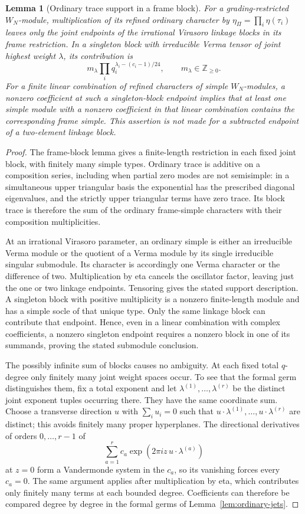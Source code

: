 \documentclass[11pt,a4paper]{article}
\numberwithin{equation}{section}
\newtheorem{lemma}[theorem]{Lemma}
\theoremstyle{definition}\newtheorem{definition}[theorem]{Definition}
\theoremstyle{remark}\newtheorem{remark}[theorem]{Remark}
\begin{document}
\begin{lemma}[Ordinary trace support in a frame block]
\label{lem:ordinary-support}
For a grading-restricted $W_N$-module, multiplication of its refined
ordinary character by $\eta_\Pi=\prod_i\eta(\tau_i)$ leaves only
the joint endpoints of the irrational Virasoro linkage blocks in
its frame restriction.  In a singleton block with irreducible
Verma tensor of joint highest weight $\lambda$, its contribution is
\[
 m_\lambda\prod_iq_i^{\lambda_i-(c_i-1)/24},
 \qquad m_\lambda\in\mathbb Z_{\ge0}.
\]
For a finite linear combination of refined characters of simple
$W_N$-modules, a nonzero coefficient at such a \emph{singleton-block}
endpoint implies that at least one simple module with a nonzero
coefficient in that linear combination contains the corresponding
frame simple.  This assertion is not made for a subtracted endpoint
of a two-element linkage block.
\end{lemma}
\begin{proof}
The frame-block lemma gives a finite-length restriction in each
fixed joint block, with finitely many simple types.  Ordinary trace
is additive on a composition series, including when partial zero
modes are not semisimple: in a simultaneous upper triangular basis
the exponential has the prescribed diagonal eigenvalues, and the
strictly upper triangular terms have zero trace.  Its block trace
is therefore the sum of the ordinary frame-simple characters with
their composition multiplicities.

At an irrational Virasoro parameter, an ordinary simple is either
an irreducible Verma module or the quotient of a Verma module by
its single irreducible singular submodule.  Its character is
accordingly one Verma character or the difference of two.  Multiplication
by eta cancels the oscillator factor, leaving just the one or two
linkage endpoints.  Tensoring gives the stated support description.
A singleton block with positive multiplicity is a nonzero
finite-length module and has a simple socle of that unique type.
Only the same linkage block can contribute that endpoint.  Hence,
even in a linear combination with complex coefficients, a nonzero
singleton endpoint requires a nonzero block in one of its summands,
proving the stated submodule conclusion.

The possibly infinite sum of blocks causes no ambiguity.  At each
fixed total $q$-degree only finitely many joint weight spaces occur.
To see that the formal germ distinguishes them, fix a total
exponent and let $\lambda^{(1)},\ldots,\lambda^{(r)}$ be the distinct
joint exponent tuples occurring there. They have the same coordinate
sum. Choose a transverse direction $u$ with $\sum_i u_i=0$ such that
$u\cdot\lambda^{(1)},\ldots,u\cdot\lambda^{(r)}$ are distinct;
this avoids finitely many proper hyperplanes. The directional
derivatives of orders $0,\ldots,r-1$ of
\[
 \sum_{a=1}^r c_a\exp(2\pi i z\,u\cdot\lambda^{(a)})
\]
at $z=0$ form a Vandermonde system in the $c_a$, so its vanishing
forces every $c_a=0$. The same argument applies after multiplication
by eta, which contributes only finitely many terms at each bounded
degree. Coefficients can therefore be compared degree by degree in
the formal germs of Lemma~\ref{lem:ordinary-jets}.
\end{proof}
\end{document}
